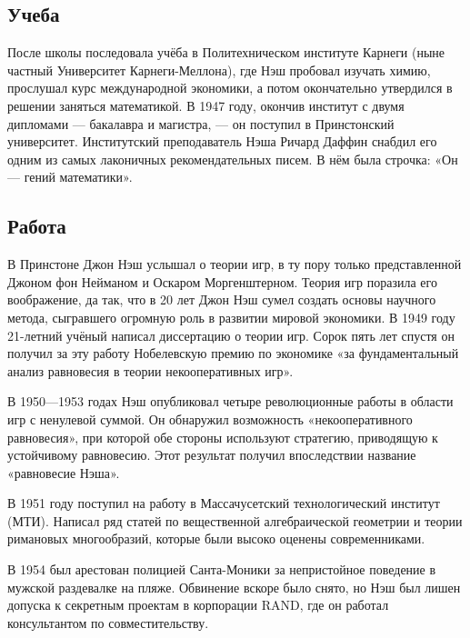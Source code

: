 \documentclass[14pt, a4paper]{extarticle}
\begin{document}
\subsection{Учеба}
После школы последовала учёба в Политехническом институте Карнеги
(ныне частный Университет Карнеги-Меллона), где Нэш пробовал изучать химию,
прослушал курс международной экономики, а потом окончательно утвердился в
решении заняться математикой. В 1947 году, окончив институт с двумя
дипломами — бакалавра и магистра, — он поступил в Принстонский университет.
Институтский преподаватель Нэша Ричард Даффин снабдил его одним из самых
лаконичных рекомендательных писем. В нём была строчка: «Он — гений математики».

\subsection{Работа} В Принстоне Джон Нэш услышал о теории игр, в ту пору только
представленной Джоном фон Нейманом и Оскаром Моргенштерном. Теория игр поразила
его воображение, да так, что в 20 лет Джон Нэш сумел создать основы научного
метода, сыгравшего огромную роль в развитии мировой экономики. В 1949 году
21-летний учёный написал диссертацию\cite{jn50d} о теории игр. Сорок пять лет
спустя он получил за эту работу Нобелевскую премию по экономике «за
фундаментальный анализ равновесия в теории некооперативных игр».

В 1950—1953 годах Нэш опубликовал четыре революционные
работы\cite{jn50a,jn50c,jn51,jn53} в области игр с ненулевой суммой. Он
обнаружил возможность «некооперативного равновесия», при которой обе стороны
используют стратегию, приводящую к устойчивому равновесию.  Этот результат
получил впоследствии название «равновесие Нэша».

В 1951 году поступил на работу в Массачусетский технологический институт (МТИ).
Написал ряд статей по вещественной алгебраической геометрии и теории римановых
многообразий, которые были высоко оценены современниками.

В 1954 был арестован полицией Санта-Моники за непристойное поведение в мужской
раздевалке на пляже. Обвинение вскоре было снято, но Нэш был лишен допуска
к секретным проектам в корпорации RAND, где он работал консультантом по
совместительству.
\end{document}
